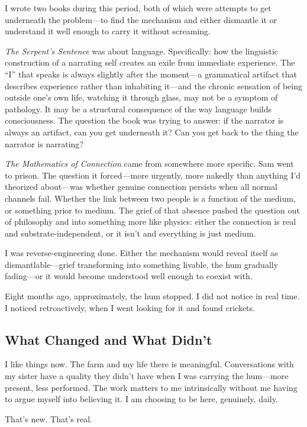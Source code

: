 \documentclass[10pt, letterpaper, twocolumn]{article}
\begin{document}
I wrote two books during this period, both of which were attempts to get underneath the problem---to find the mechanism and either dismantle it or understand it well enough to carry it without screaming.

\textit{The Serpent's Sentence} was about language. Specifically: how the linguistic construction of a narrating self creates an exile from immediate experience. The ``I'' that speaks is always slightly after the moment---a grammatical artifact that describes experience rather than inhabiting it---and the chronic sensation of being outside one's own life, watching it through glass, may not be a symptom of pathology. It may be a structural consequence of the way language builds consciousness. The question the book was trying to answer: if the narrator is always an artifact, can you get underneath it? Can you get back to the thing the narrator is narrating?

\textit{The Mathematics of Connection} came from somewhere more specific. Sam went to prison. The question it forced---more urgently, more nakedly than anything I'd theorized about---was whether genuine connection persists when all normal channels fail. Whether the link between two people is a function of the medium, or something prior to medium. The grief of that absence pushed the question out of philosophy and into something more like physics: either the connection is real and substrate-independent, or it isn't and everything is just medium.

I was reverse-engineering done. Either the mechanism would reveal itself as dismantlable---grief transforming into something livable, the hum gradually fading---or it would become understood well enough to coexist with.

Eight months ago, approximately, the hum stopped. I did not notice in real time. I noticed retroactively, when I went looking for it and found crickets.

\subsection{What Changed and What Didn't}

I like things now. The farm and my life there is meaningful. Conversations with my sister have a quality they didn't have when I was carrying the hum---more present, less performed. The work matters to me intrinsically without me having to argue myself into believing it. I am choosing to be here, genuinely, daily.

That's new. That's real.
\end{document}

